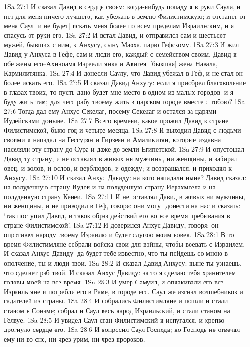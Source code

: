 1Sa 27:1  И сказал Давид в сердце своем: когда-нибудь попаду я в руки Саула, и нет для меня ничего лучшего, как убежать в землю Филистимскую; и отстанет от меня Саул [и не будет] искать меня более по всем пределам Израильским, и я спасусь от руки его.
1Sa 27:2  И встал Давид, и отправился сам и шестьсот мужей, бывших с ним, к Анхусу, сыну Маоха, царю Гефскому.
1Sa 27:3  И жил Давид у Анхуса в Гефе, сам и люди его, каждый с семейством своим, Давид и обе жены его--Ахиноама Изреелитянка и Авигея, [бывшая] жена Навала, Кармилитянка.
1Sa 27:4  И донесли Саулу, что Давид убежал в Геф, и не стал он более искать его.
1Sa 27:5  И сказал Давид Анхусу: если я приобрел благоволение в глазах твоих, то пусть дано будет мне место в одном из малых городов, и я буду жить там; для чего рабу твоему жить в царском городе вместе с тобою?
1Sa 27:6  Тогда дал ему Анхус Секелаг, посему Секелаг и остался за царями Иудейскими доныне.
1Sa 27:7  Всего времени, какое прожил Давид в стране Филистимской, было год и четыре месяца.
1Sa 27:8  И выходил Давид с людьми своими и нападал на Гессурян и Гирзеян и Амаликитян, которые издавна населяли эту страну до Сура и даже до земли Египетской.
1Sa 27:9  И опустошал Давид ту страну, и не оставлял в живых ни мужчины, ни женщины, и забирал овец, и волов, и ослов, и верблюдов, и одежду; и возвращался, и приходил к Анхусу.
1Sa 27:10  И сказал Анхус Давиду: на кого нападали ныне? Давид сказал: на полуденную страну Иудеи и на полуденную страну Иерахмеела и на полуденную страну Кенеи.
1Sa 27:11  И не оставлял Давид в живых ни мужчины, ни женщины, и не приводил в Геф, говоря: они могут донести на нас и сказать: `так поступил Давид, и таков образ действий его во все время пребывания в стране Филистимской'.
1Sa 27:12  И доверился Анхус Давиду, говоря: он опротивел народу своему Израилю и будет слугою моим вовек.
1Sa 28:1  В то время Филистимляне собрали войска свои для войны, чтобы воевать с Израилем. И сказал Анхус Давиду: да будет тебе известно, что ты пойдешь со мною в ополчение, ты и люди твои.
1Sa 28:2  И сказал Давид Анхусу: ныне ты узнаешь, что сделает раб твой. И сказал Анхус Давиду: за то я сделаю тебя хранителем головы моей на все время.
1Sa 28:3  И умер Самуил, и оплакивали его все Израильтяне и погребли его в Раме, в городе его. Саул же изгнал волшебников и гадателей из страны.
1Sa 28:4  И собрались Филистимляне и пошли и стали станом в Сонаме; собрал и Саул весь народ Израильский, и стали станом на Гелвуе.
1Sa 28:5  И увидел Саул стан Филистимский и испугался, и крепко дрогнуло сердце его.
1Sa 28:6  И вопросил Саул Господа; но Господь не отвечал ему ни во сне, ни чрез урим, ни чрез пророков.
